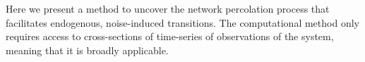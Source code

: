 \documentclass[a4paper, 11pt, twocolumn]{article}
\begin{document}

Here we present a  method   to    uncover the network percolation process that facilitates  endogenous,   noise-induced
transitions. The computational method only requires access to cross-sections of time-series of observations of the  system, meaning
that it is broadly applicable.

\end{document}
